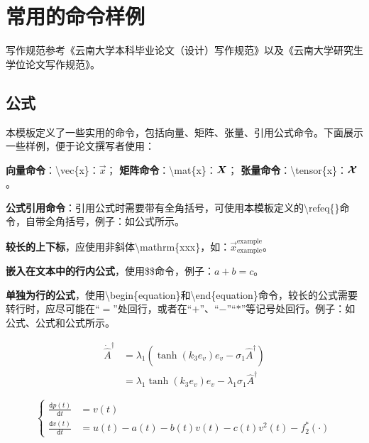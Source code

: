 \chapter{常用的命令样例}
\label{cha:chap2}

写作规范参考《云南大学本科毕业论文（设计）写作规范》以及《云南大学研究生学位论文写作规范》。

\section{公式}

本模板定义了一些实用的命令，包括向量、矩阵、张量、引用公式命令。下面展示一些样例，便于论文撰写者使用：

\textbf{向量命令}：\textbackslash vec\{x\}：$\vec{x}$；
\textbf{矩阵命令}：\textbackslash mat\{x\}：$\bm{X}$；
\textbf{张量命令}：\textbackslash tensor\{x\}：$\boldsymbol{\mathcal{X}}$。

\textbf{公式引用命令}：引用公式时需要带有全角括号，可使用本模板定义的\textbackslash refeq\{\}命令，自带全角括号，例子：如公式所示。

\textbf{较长的上下标}，应使用非斜体\textbackslash mathrm\{xxx\}，如：$\vec{x}_{\mathrm{example}}^{\mathrm{example}}$。


\textbf{嵌入在文本中的行内公式}，使用\$\$命令，例子：$a + b = c$。

\textbf{单独为行的公式}，使用\textbackslash begin\{equation\}和\textbackslash end\{equation\}命令，较长的公式需要转行时，应尽可能在“$ = $”处回行，或者在“$ + $”、“$-$”“$*$”等记号处回行。例子：如公式、公式和公式所示。

\begin{equation}\label{eq:ch2-aligned}
	\begin{aligned}
		\dot{\hat{A}}^\dag
		&=\lambda_1\left(\tanh(k_3e_v)e_v-\sigma_1\hat{A}^\dag\right)\\
		&=\lambda_1\tanh(k_3e_v)e_v-\lambda_1\sigma_1\hat{A}^\dag
	\end{aligned}
\end{equation}


\begin{equation}\label{eq:ch2-split}
	\left\{
	\begin{aligned}
		\frac{\texttt{d}p(t)}{\texttt{d}t} &= v(t) \\
		\frac{\texttt{d}v(t)}{\texttt{d}t} &= u(t)-a(t)-b(t)v(t)-c(t)v^2(t)-f_2^*(\cdot)
	\end{aligned}
	\right.
\end{equation}




